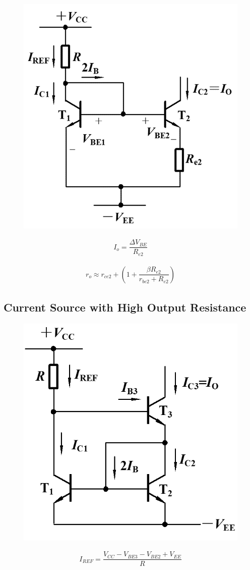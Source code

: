 \begin{figure}[H]
  \centering
  \includegraphics[width=0.4\linewidth]{figures/Micro-Current-Source}
  \label{fig:}
\end{figure}

\begin{equation*}
  \begin{aligned}
    I_o = \dfrac{\Delta V_{BE}}{R_{e2}} 
  \end{aligned}
\end{equation*}

\begin{equation*}
  \begin{aligned}
    r_o \approx r_{ce2} + \left( 1 + \dfrac{\beta R_{e2}}{r_{be2} + R_{e2}}  \right)
  \end{aligned}
\end{equation*}

\subsection{Current Source with High Output Resistance}

\begin{figure}[H]
  \centering
  \includegraphics[width=0.4\linewidth]{figures/High-Resistance-Current-Source}
  \label{fig:}
\end{figure}

\begin{equation*}
  \begin{aligned}
    I_{REF} = \dfrac{V_{CC} - V_{BE3} - V_{BE2} + V_{EE}}{R} 
  \end{aligned}
\end{equation*}

